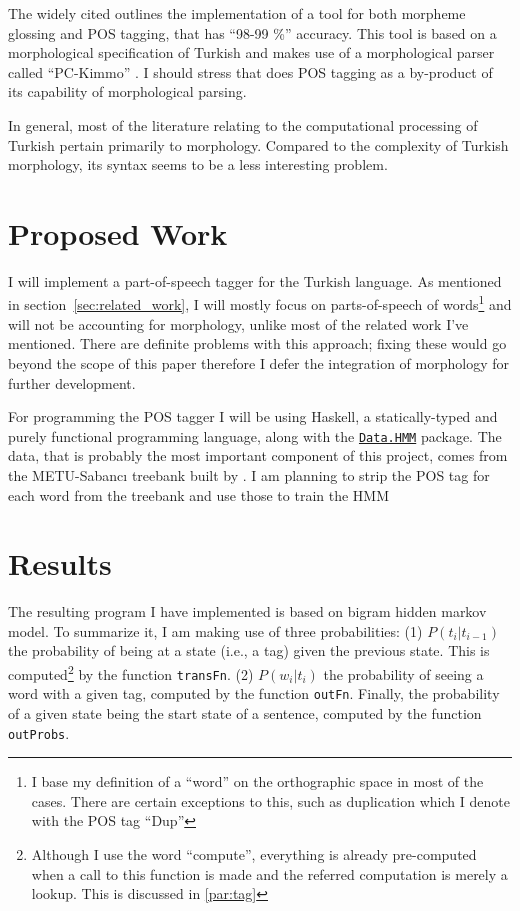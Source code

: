 \documentclass{article}
\newcommand{\hmmURL}{https://hackage.haskell.org/package/hmm-0.2.1.1/docs/Data-HMM.html}
\begin{document}
The widely cited \citet{oflazer1994tagging} outlines the implementation of a
tool for both morpheme glossing and POS tagging, that has ``98-99 \%'' accuracy.
This tool is based on a morphological specification of Turkish and makes use of
a morphological parser called ``PC-Kimmo'' \citep{antworth1991pc}. I should
stress that \citet{oflazer1994tagging} does POS tagging as a by-product of its
capability of morphological parsing.

In general, most of the literature relating to the computational processing of
Turkish pertain primarily to morphology. Compared to the complexity of Turkish
morphology, its syntax seems to be a less interesting problem.

\section{Proposed Work}

I will implement a part-of-speech tagger for the Turkish language. As mentioned
in section~\ref{sec:related_work}, I will mostly focus on parts-of-speech of
words\footnote{I base my definition of a ``word'' on the orthographic space in
  most of the cases. There are certain exceptions to this, such as duplication
  which I denote with the POS tag ``Dup''} and will not be accounting for
morphology, unlike most of the related work I've mentioned. There are definite
problems with this approach; fixing these would go beyond the scope of this
paper therefore I defer the integration of morphology for further development.

For programming the POS tagger I will be using Haskell, a statically-typed and
purely functional programming language, along with the
\href{\hmmURL}{\texttt{Data.HMM}} package. The data, that is probably the most
important component of this project, comes from the METU-Sabanc{\i} treebank
built by \citet{oflazer2003building}. I am planning to strip the POS tag for
each word from the treebank and use those to train the HMM

\section{Results}

The resulting program I have implemented is based on bigram hidden markov model.
To summarize it, I am making use of three probabilities: (1) $P(t_i | t_{i-1})$
the probability of being at a state (i.e., a tag) given the previous state. This
is computed\footnote{Although I use the word ``compute'', everything is already
  pre-computed when a call to this function is made and the referred computation
  is merely a lookup. This is discussed in \ref{par:tag}} by the function
\texttt{transFn}. (2) $P(w_i | t_i)$ the probability of seeing a word with a
given tag, computed by the function \texttt{outFn}. Finally, the probability of
a given state being the start state of a sentence, computed by the function
\texttt{outProbs}.
\end{document}
